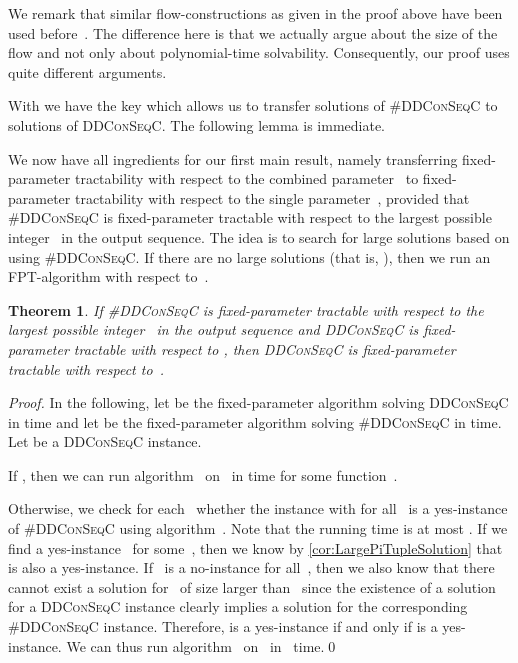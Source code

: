 \documentclass[a4paper,11pt]{article}
\theoremstyle{remark}
\theoremstyle{plain}
\newtheorem{theorem}{Theorem}
\newtheorem{lemma}[theorem]{Lemma}
\theoremstyle{definition}
\newcommand{\numO}{\textsc{\#}}
\newcommand{\DDCSC}{\textsc{DDConSeqC}\xspace}
\newcommand{\nDDCSC}{\numO\DDCSC}
\begin{document}
We remark that similar flow-constructions as given in the proof above have been used before~\cite{Gal57,CMPPS14}.
The difference here is that we actually argue about the size of the flow and not only about polynomial-time solvability. Consequently, our proof uses quite different arguments. 


With  we have the key which allows us to transfer solutions of \nDDCSC to solutions of \DDCSC. The following lemma is immediate.


We now have all ingredients for our first main result, namely transferring
fixed-parameter tractability with respect to the combined parameter~ to
fixed-parameter tractability with respect to the single parameter~, provided that \nDDCSC is fixed-parameter tractable with respect to the largest possible integer~ in the output sequence.
The idea is to search for large solutions based on  using \nDDCSC.
If there are no large solutions (that is, ), then we run an FPT-algorithm with respect to~.

\begin{theorem}\label{thm:FPT_transfer}
  If \nDDCSC is fixed-parameter tractable with respect to the largest possible integer~ in the output sequence and \DDCSC is fixed-parameter tractable with respect to , then \DDCSC is fixed-parameter tractable with respect to~.
\end{theorem}

\begin{proof}
  In the following, let  be the fixed-parameter algorithm solving \DDCSC in  time
  and let  be the fixed-parameter algorithm solving \nDDCSC in  time.
  Let  be a \DDCSC instance.

  If , then we can run algorithm~ on~
  in  time for some function~.

  Otherwise, we check for each~ whether the instance  with  for all~ is a yes-instance of \nDDCSC using algorithm~. Note that the running time is at most .
  If we find a yes-instance~ for some~, then we know by \cref{cor:LargePiTupleSolution} that  is also a yes-instance. If~ is a no-instance for all~, then we also know that there cannot exist a solution for~ of size larger than~ since the existence of a solution for a \DDCSC instance clearly implies a solution for the corresponding \nDDCSC instance.
  Therefore,  is a yes-instance if and only if  is a yes-instance.
  We can thus run algorithm~ on~ in~ time.\qed
\end{proof}
\end{document}
